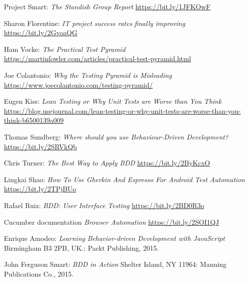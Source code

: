 \documentclass[conference]{IEEEtran}
\begin{document}
%
%
%
\begin{thebibliography}{1}
Project Smart: \emph{The Standish Group Report} \url{https://bit.ly/1JFKOwF}

Sharon Florentine: \emph{IT project success rates finally improving} \url{https://bit.ly/2GvoaQG}

Ham Vocke: \emph{The Practical Test Pyramid} \url{https://martinfowler.com/articles/practical-test-pyramid.html}

Joe Colantonio: \emph{Why the Testing Pyramid is Misleading} \url{https://www.joecolantonio.com/testing-pyramid/}

Eugen Kiss: \emph{Lean Testing or Why Unit Tests are Worse than You Think} \url{https://blog.usejournal.com/lean-testing-or-why-unit-tests-are-worse-than-you-think-b6500139a009}

Thomas Sundberg: \emph{Where should you use Behaviour-Driven Development?} \url{https://bit.ly/2SRVkQb}

Chris Turner: \emph{The Best Way to Apply BDD} \url{https://bit.ly/2ByKcxO}

Lingkai Shao: \emph{How To Use Gherkin And Espresso For Android Test Automation} \url{https://bit.ly/2TPjBUo}

Rafael Ruiz: \emph{BDD: User Interface Testing} \url{https://bit.ly/2BD0R3o}

Cucumber documentation \emph{Browser Automation}
\url{https://bit.ly/2SOI1QJ}

Enrique Amodeo: \emph{Learning Behavior-driven Development with JavaScript} Birmingham B3 2PB, UK.: Packt Publishing, 2015.

John Ferguson Smart: \emph{BDD in Action} Shelter Island, NY 11964: Manning Publications Co., 2015.


\end{thebibliography}
\end{document}

